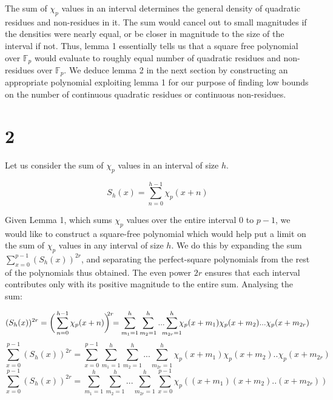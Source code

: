 \documentclass{article}
\begin{document}
%
The sum of $\chi_p$ values in an interval determines the general density of quadratic residues and non-residues in it. The sum would cancel out to small magnitudes if the densities were nearly equal, or be closer in magnitude to the size of the interval if not. Thus, lemma 1 essentially tells us that a square free polynomial over $\mathbb{F}_p$ would evaluate to roughly equal number of quadratic residues and non-residues over $\mathbb{F}_p$. We deduce lemma 2 in the next section by constructing an appropriate polynomial exploiting lemma 1 for our purpose of finding low bounds on the number of continuous quadratic residues or continuous non-residues.
%
\section{ 2}
%
Let us consider the sum of $\chi_p$ values in an interval of size $h$.

$$S_h(x)=\sum\limits_{n=0}^{h-1}\chi_p(x+n)$$

Given Lemma 1, which sums $\chi_p$ values over the entire interval $0$ to $p-1$, we would like to construct a square-free polynomial which would help put a limit on the sum of $\chi_p$ values in any interval of size $h$. We do this by expanding the sum $\sum\limits_{x=0}^{p-1}(S_h(x))^{2r}$, and separating the perfect-square polynomials from the rest of the polynomials thus obtained. The even power $2r$ ensures that each interval contributes only with its positive magnitude to the entire sum. Analysing the sum:

$$(S_h(x))^{2r}= \bigg(\sum\limits_{n=0}^{h-1}\chi_p(x+n)\bigg)^{\mathclap{2r}} =\sum\limits_{m_1=1}^h\sum\limits_{m_2=1}^h...\sum\limits_{\mathclap{m_{2r}=1}}^h\chi_p(x+m_1)\chi_p(x+m_2)...\chi_p(x+m_{2r})$$
$$\sum\limits_{x=0}^{p-1}(S_h(x))^{2r}=\sum\limits_{x=0}^{p-1}\sum\limits_{m_1=1}^h\sum\limits_{m_2=1}^h...\sum\limits_{m_{2r}=1}^h\chi_p(x+m_1)\chi_p(x+m_2)..\chi_p(x+m_{2r})$$
\begin{equation} \label{sumpoly}
\sum\limits_{x=0}^{p-1}(S_h(x))^{2r}=\sum\limits_{m_1=1}^h\sum\limits_{m_2=1}^h...\sum\limits_{m_{2r}=1}^h\sum\limits_{x=0}^{p-1}\chi_p((x+m_1)(x+m_2)..(x+m_{2r}))
\end{equation}
\end{document}
